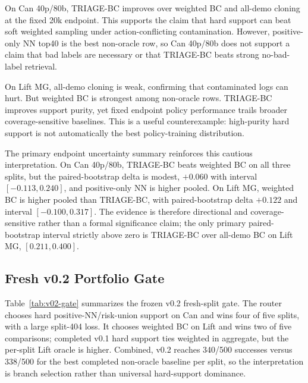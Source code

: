 \documentclass{article}
\newcommand{\method}{TRIAGE-BC}
\begin{document}
On Can 40p/80b, \method{} improves over weighted BC and all-demo cloning at the fixed 20k endpoint. This supports the claim that hard support can beat soft weighted sampling under action-conflicting contamination. However, positive-only NN top40 is the best non-oracle row, so Can 40p/80b does not support a claim that bad labels are necessary or that \method{} beats strong no-bad-label retrieval.

On Lift MG, all-demo cloning is weak, confirming that contaminated logs can hurt. But weighted BC is strongest among non-oracle rows. \method{} improves support purity, yet fixed endpoint policy performance trails broader coverage-sensitive baselines. This is a useful counterexample: high-purity hard support is not automatically the best policy-training distribution.

The primary endpoint uncertainty summary reinforces this cautious interpretation. On Can 40p/80b, \method{} beats weighted BC on all three splits, but the paired-bootstrap delta is modest, $+0.060$ with interval $[-0.113,0.240]$, and positive-only NN is higher pooled. On Lift MG, weighted BC is higher pooled than \method{}, with paired-bootstrap delta $+0.122$ and interval $[-0.100,0.317]$. The evidence is therefore directional and coverage-sensitive rather than a formal significance claim; the only primary paired-bootstrap interval strictly above zero is \method{} over all-demo BC on Lift MG, $[0.211,0.400]$.

\subsection{Fresh v0.2 Portfolio Gate}

Table~\ref{tab:v02-gate} summarizes the frozen v0.2 fresh-split gate. The router chooses hard positive-NN/risk-union support on Can and wins four of five splits, with a large split-404 loss. It chooses weighted BC on Lift and wins two of five comparisons; completed v0.1 hard support ties weighted in aggregate, but the per-split Lift oracle is higher. Combined, v0.2 reaches 340/500 successes versus 338/500 for the best completed non-oracle baseline per split, so the interpretation is branch selection rather than universal hard-support dominance.

\begin{table}[t]
  \centering
  \caption{Frozen v0.2 fresh endpoint gate. Counts are successes over 50 endpoint rollouts per split at epoch 200.}
  \label{tab:v02-gate}
\end{table}
\end{document}
